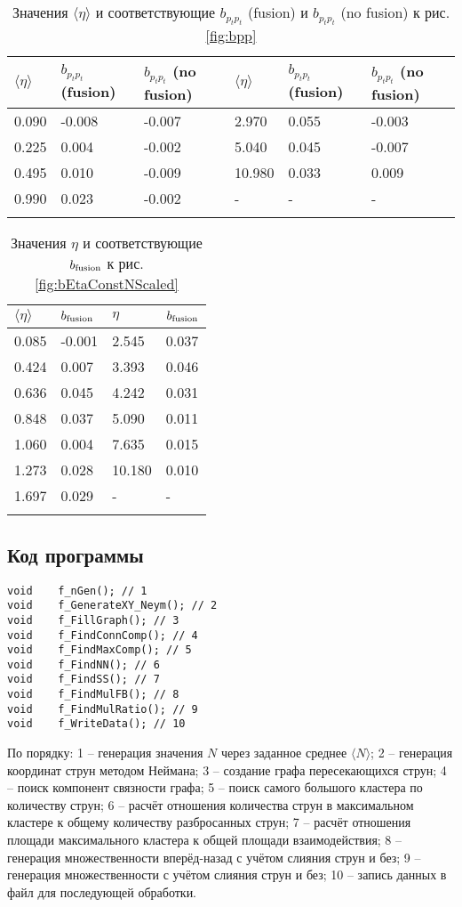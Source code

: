 {\footnotesize
\begin{longtable}{| l | l | l || l | l | l |}
	\hline
	$\langle \eta \rangle$	&	$b_{p_tp_t}$ (fusion)	&	$b_{p_tp_t}$ (no fusion)	&	$\langle \eta \rangle$	&	$b_{p_tp_t}$ (fusion)	&	$b_{p_tp_t}$ (no fusion)	\\
	\hline
	0.090	&	-0.008	&	-0.007	&	2.970	&	0.055	&	-0.003	\\
	0.225	&	0.004	&	-0.002	&	5.040	&	0.045	&	-0.007	\\
	0.495	&	0.010	&	-0.009	&	10.980	&	0.033	&	0.009	\\
	0.990	&	0.023	&	-0.002	&	-		&	-		&		-	\\
	\hline
	\caption{Значения $\langle \eta \rangle$ и соответствующие $b_{p_tp_t}$ (fusion) и $b_{p_tp_t}$ (no fusion) к рис. \ref{fig:bpp}} \label{tab:bnn}
\end{longtable}}



{\footnotesize
\begin{longtable}{| l | l || l | l |}
	\hline
	$\langle \eta \rangle$	&	$b_{\textnormal{fusion}}$	&	$\eta$	&	$b_{\textnormal{fusion}}$	\\
	\hline
	0.085	&	-0.001	&	2.545	&	0.037	\\
	0.424	&	0.007	&	3.393	&	0.046	\\
	0.636	&	0.045	&	4.242	&	0.031	\\
	0.848	&	0.037	&	5.090	&	0.011	\\
	1.060	&	0.004	&	7.635	&	0.015	\\
	1.273	&	0.028	&	10.180	&	0.010	\\
	1.697	&	0.029	&	-		&	-	\\
	\hline
	\caption{Значения $\eta$ и соответствующие $b_{\textnormal{fusion}}$ к рис. \ref{fig:bEtaConstNScaled}} \label{tab:bEtaConstN}
\end{longtable}}
\newpage
\subsection{Код программы}
\begin{lstlisting}
void	f_nGen(); // 1
void	f_GenerateXY_Neym(); // 2
void	f_FillGraph(); // 3
void	f_FindConnComp(); // 4
void	f_FindMaxComp(); // 5
void	f_FindNN(); // 6
void	f_FindSS(); // 7
void	f_FindMulFB(); // 8
void	f_FindMulRatio(); // 9
void	f_WriteData(); // 10
\end{lstlisting}
По порядку:  1 -- генерация значения $N$ через заданное среднее $\langle N \rangle$; 2 -- генерация координат струн методом Неймана; 3 -- создание графа пересекающихся струн; 4 -- поиск компонент связности графа; 5 -- поиск самого большого кластера по количеству струн; 6 -- расчёт отношения количества струн в максимальном кластере к общему количеству разбросанных струн; 7 -- расчёт отношения площади максимального кластера к общей площади взаимодействия; 8 -- генерация множественности вперёд-назад с учётом слияния струн и без; 9 -- генерация множественности с учётом слияния струн и без; 10 -- запись данных в файл для последующей обработки.


